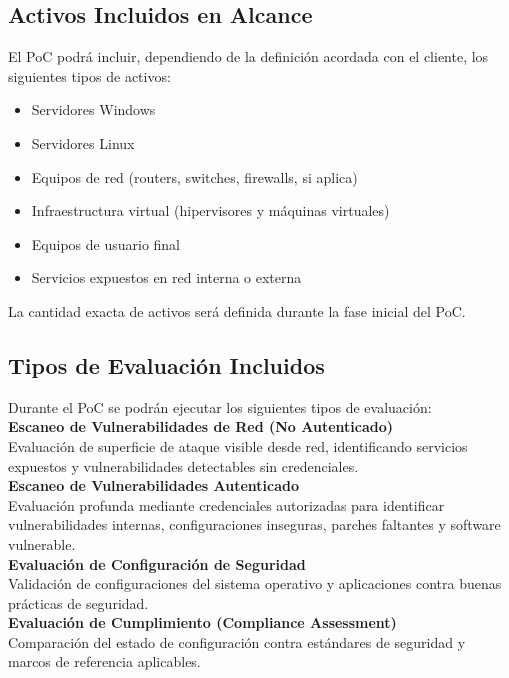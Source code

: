 \documentclass[a4paper]{article}
\begin{document}
    \subsection{Activos Incluidos en Alcance}
    El PoC podrá incluir, dependiendo de la definición acordada con el cliente, los siguientes tipos de activos:
    \begin{itemize}
        \item Servidores Windows
        \item Servidores Linux
        \item Equipos de red (routers, switches, firewalls, si aplica)
        \item Infraestructura virtual (hipervisores y máquinas virtuales)
        \item Equipos de usuario final
        \item Servicios expuestos en red interna o externa
    \end{itemize}
    La cantidad exacta de activos será definida durante la fase inicial del PoC.
    \subsection{Tipos de Evaluación Incluidos}
    Durante el PoC se podrán ejecutar los siguientes tipos de evaluación:
    \\

    \textbf{Escaneo de Vulnerabilidades de Red (No Autenticado)}\\
    Evaluación de superficie de ataque visible desde red, identificando servicios expuestos y vulnerabilidades detectables sin credenciales.
    \\

    \textbf{Escaneo de Vulnerabilidades Autenticado}
    \\
    Evaluación profunda mediante credenciales autorizadas para identificar vulnerabilidades internas, configuraciones inseguras, parches faltantes y software vulnerable.
    \\

    \textbf{Evaluación de Configuración de Seguridad}
    \\
    Validación de configuraciones del sistema operativo y aplicaciones contra buenas prácticas de seguridad.
    \\

    \textbf{Evaluación de Cumplimiento (Compliance Assessment)}
    \\
    Comparación del estado de configuración contra estándares de seguridad y marcos de referencia aplicables.
\end{document}
